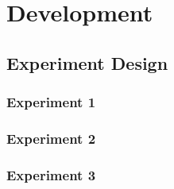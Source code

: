 \chapter{Development}

\section{Experiment Design}

\subsection{Experiment 1}

\subsection{Experiment 2}

\subsection{Experiment 3}
